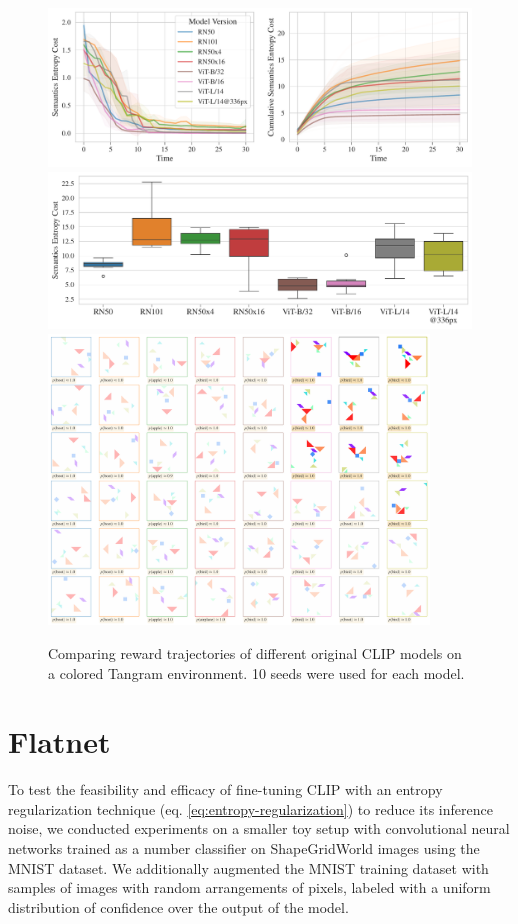 \begin{figure}[h]
    \centering    
    \includegraphics[width=\textwidth]{images/model_comparison_color.pdf}
    \includegraphics[width=\textwidth]{images/model_comparison_boxplot_color.pdf}
    \includegraphics[width=0.9\textwidth]{images/model_samples_color.pdf}
    \caption{Comparing reward trajectories of different original CLIP models on a colored Tangram environment. 10 seeds were used for each model.}    
\end{figure}


\chapter{Flatnet}
\label{sec:flatnet}
To test the feasibility and efficacy of fine-tuning CLIP with an entropy regularization technique (eq. \ref{eq:entropy-regularization}) to reduce its inference noise, we conducted experiments on a smaller toy setup with convolutional neural networks trained as a number classifier on ShapeGridWorld images using the MNIST dataset.
We additionally augmented the MNIST training dataset with samples of images with random arrangements of pixels, labeled with a uniform distribution of confidence over the output of the model.

